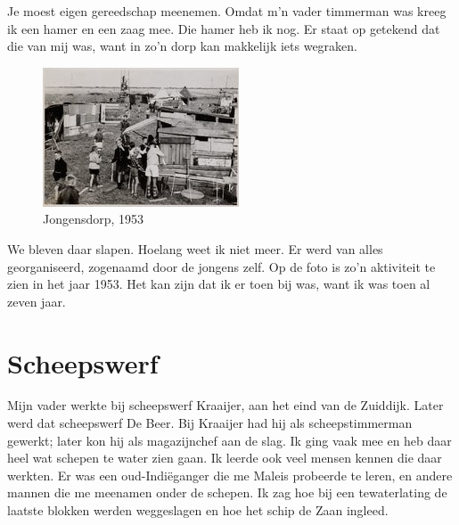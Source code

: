 \documentclass[12pt,twoside]{memoir}
\begin{document}
Je moest eigen gereedschap meenemen. Omdat m’n vader timmerman was kreeg ik een hamer en een zaag mee. Die hamer heb ik nog. Er staat op getekend dat die van mij was, want in zo’n dorp kan makkelijk iets wegraken. 

\begin{figure}
\includegraphics[width=\textwidth]{img/ch14/jongensdorp1953}
\caption*{\footnotesize Jongensdorp, 1953}
\end{figure}

We bleven daar slapen. Hoelang weet ik niet meer. Er werd van alles georganiseerd, zogenaamd door de jongens zelf. Op de foto is zo’n aktiviteit te zien in het jaar 1953. Het kan zijn dat ik er toen bij was, want ik was toen al zeven jaar.

\chapter{Scheepswerf} %
\label{cha:scheepswerf}

Mijn vader werkte bij scheepswerf Kraaijer, aan het eind van de Zuiddijk. Later werd dat scheepswerf De Beer. Bij Kraaijer had hij als scheepstimmerman gewerkt; later kon hij als magazijnchef aan de slag. Ik ging vaak mee en heb daar heel wat schepen te water zien gaan. Ik leerde ook veel mensen kennen die daar werkten. Er was een oud-Indiëganger die me Maleis probeerde te leren, en andere mannen die me meenamen onder de schepen. Ik zag hoe bij een tewaterlating de laatste blokken werden weggeslagen en hoe het schip de Zaan ingleed. 
\end{document}
